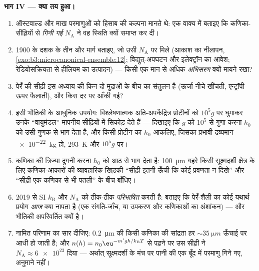 \begin{problem}
\medskip\noindent\textbf{भाग IV --- क्या तय हुआ।}
\begin{enumerate}[resume]
  \item ऑस्टवाल्ड और माख परमाणुओं को हिसाब की कल्पना मानते थे: एक
        वाक्य में बताइए कि कणिका-सीढ़ियों से \emph{गिनी गई}
        $N_{\text{A}}$ ने वह स्थिति क्यों समाप्त कर दी।
  \item 1900 के दशक के तीन और मार्ग बताइए, जो उसी
        $N_{\text{A}}$ पर मिले (आकाश का नीलापन,
        \cref{exo:b3:microcanonical-ensemble:12}; विद्युत्-अपघटन
        और इलेक्ट्रॉन का आवेश; रेडियोसक्रियता से हीलियम का
        उत्पादन) --- किसी एक मान से अधिक \emph{अभिसरण} क्यों
        मायने रखा?
  \item पेरँ की सीढ़ी इस अध्याय की किन दो मुद्राओं के बीच का
        संतुलन है (ऊर्जा नीचे खींचती, एन्ट्रॉपी ऊपर फैलाती), और
        किस दर पर आँकी गई?
  \item इसी भौतिकी के आधुनिक उपयोग: विश्लेषणात्मक
        अति-अपकेंद्रित्र प्रोटीनों को $10^5g$ पर घुमाकर उनके
        ``वायुमंडल'' मापनीय सीढ़ियों में सिकोड़ देते हैं --- दिखाइए
        कि $g$ को $10^5$ से गुणा करना $h_0$ को उसी
        गुणक से भाग देता है, और किसी प्रोटीन का $h_0$ आकलिए,
        जिसका प्रभावी द्रव्यमान \qty{e-22}{kg} हो, \qty{293}{K} और
        $10^5g$ पर।
  \item कणिका की त्रिज्या दुगनी करना $h_0$ को आठ से भाग देता है:
        \qty{100}{\micro m} गहरे किसी सूक्ष्मदर्शी क्षेत्र के लिए
        कणिका-आकारों की व्यावहारिक खिड़की ``सीढ़ी इतनी ऊँची कि कोई
        प्रवणता न दिखे'' और ``सीढ़ी एक कणिका से भी पतली'' के बीच
        बाँधिए।
  \item 2019 से SI $k_{\text{B}}$ और
        $N_{\text{A}}$ को ठीक-ठीक \emph{परिभाषित} करती है: बताइए
        कि पेरँ-शैली का कोई यथार्थ प्रयोग \emph{आज} क्या नापता है
        (एक संगति-जाँच, या उपकरण और कणिकाओं का अंशांकन) --- और
        भौतिकी अपरिवर्तित क्यों है।
  \item नामित परिणाम का सार दीजिए: \qty{0.2}{\micro m} की किसी
        कणिका की सांद्रता हर $\sim\qty{35}{\micro m}$ ऊँचाई पर
        आधी हो जाती है; और $n(h) = n_0\eu^{-m'gh/k_{\text{B}}T}$
        से पढ़ने पर उस सीढ़ी ने $N_{\text{A}} \approx \num{6e23}$
        दिया --- अर्थात् सूक्ष्मदर्शी के मंच पर पानी की एक बूँद
        में परमाणु गिने गए, अनुमाने नहीं।
\end{enumerate}
\end{problem}
